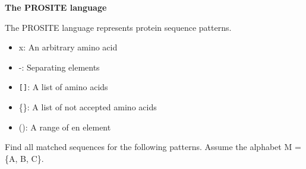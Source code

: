 \question \textbf{The PROSITE language}

The PROSITE language represents protein sequence patterns.

\begin{itemize}
\item x: An arbitrary amino acid
\item -: Separating elements
\item \verb|[]|: A list of amino acids
\item \{\}: A list of not accepted amino acids
\item (): A range of en element
\end{itemize}

Find all matched sequences for the following patterns. Assume the alphabet M = \{A, B, C\}.

\vspace{0.1 in}

